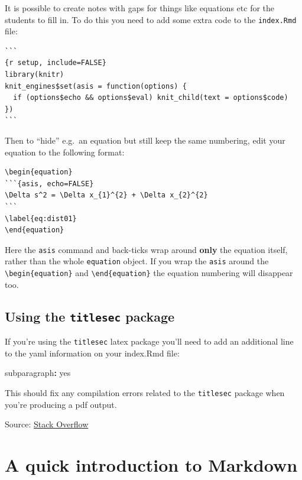 \documentclass[
]{book}
\newenvironment{Shaded}{\begin{snugshade}}{\end{snugshade}}
\newcommand{\NormalTok}[1]{#1}
\newcommand{\SpecialCharTok}[1]{\textcolor[rgb]{0.81,0.36,0.00}{\textbf{#1}}}
\begin{document}
It is possible to create notes with gaps for things like equations etc for the students to fill in. To do this you need to add some extra code to the \texttt{index.Rmd} file:

\begin{verbatim}
```
{r setup, include=FALSE}
library(knitr)
knit_engines$set(asis = function(options) {
  if (options$echo && options$eval) knit_child(text = options$code)
})
```
\end{verbatim}

Then to ``hide'' e.g.~an equation but still keep the same numbering, edit your equation to the following format:

\begin{verbatim}
\begin{equation}
```{asis, echo=FALSE}
\Delta s^2 = \Delta x_{1}^{2} + \Delta x_{2}^{2}
```
\label{eq:dist01}
\end{equation}
\end{verbatim}

Here the \texttt{asis} command and back-ticks wrap around \textbf{only} the equation itself, rather than the whole \texttt{equation} object. If you wrap the \texttt{asis} around the \texttt{\textbackslash{}begin\{equation\}} and \texttt{\textbackslash{}end\{equation\}} the equation numbering will disappear too.

\section{\texorpdfstring{Using the \texttt{titlesec} package}{Using the titlesec package}}\label{sec:titlesec}

If you're using the \texttt{titlesec} latex package you'll need to add an additional line to the yaml information on your index.Rmd file:

\begin{Shaded}
\begin{Highlighting}[]
\NormalTok{subparagraph}\SpecialCharTok{:}\NormalTok{ yes}
\end{Highlighting}
\end{Shaded}

This should fix any compilation errors related to the \texttt{titlesec} package when you're producing a pdf output.

Source: \href{https://stackoverflow.com/questions/42916124/not-able-to-use-titlesec-with-markdown-and-pandoc}{Stack Overflow}

\chapter{A quick introduction to Markdown}\label{sec:intro-markdown}
\end{document}
